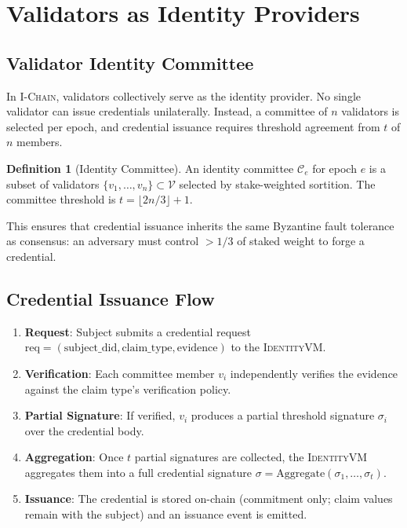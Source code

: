 \documentclass[11pt,letterpaper]{article}
\theoremstyle{definition}
\newtheorem{definition}{Definition}
\theoremstyle{remark}
\newcommand{\IChain}{\textsc{I-Chain}}
\newcommand{\IdentityVM}{\textsc{IdentityVM}}
\begin{document}
\section{Validators as Identity Providers}

\subsection{Validator Identity Committee}

In \IChain{}, validators collectively serve as the identity provider. No single validator can issue credentials unilaterally. Instead, a committee of $n$ validators is selected per epoch, and credential issuance requires threshold agreement from $t$ of $n$ members.

\begin{definition}[Identity Committee]
An identity committee $\mathcal{C}_e$ for epoch $e$ is a subset of validators $\{v_1, \ldots, v_n\} \subset \mathcal{V}$ selected by stake-weighted sortition. The committee threshold is $t = \lfloor 2n/3 \rfloor + 1$.
\end{definition}

This ensures that credential issuance inherits the same Byzantine fault tolerance as consensus: an adversary must control $> 1/3$ of staked weight to forge a credential.

\subsection{Credential Issuance Flow}

\begin{enumerate}
\item \textbf{Request}: Subject submits a credential request $\text{req} = (\text{subject\_did}, \text{claim\_type}, \text{evidence})$ to the \IdentityVM{}.
\item \textbf{Verification}: Each committee member $v_i$ independently verifies the evidence against the claim type's verification policy.
\item \textbf{Partial Signature}: If verified, $v_i$ produces a partial threshold signature $\sigma_i$ over the credential body.
\item \textbf{Aggregation}: Once $t$ partial signatures are collected, the \IdentityVM{} aggregates them into a full credential signature $\sigma = \text{Aggregate}(\sigma_1, \ldots, \sigma_t)$.
\item \textbf{Issuance}: The credential is stored on-chain (commitment only; claim values remain with the subject) and an issuance event is emitted.
\end{enumerate}
\end{document}
